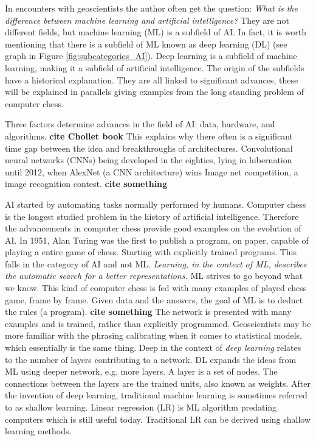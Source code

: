 \documentclass{article}
\begin{document}
In encounters with geoscientists the author often get the question: \textit{What is the difference between machine learning and artificial intelligence?} They are not different fields, but machine learning (ML) is a subfield of AI. In fact, it is worth mentioning that there is a subfield of ML known as deep learning (DL) (see graph in Figure \ref{fig:subcategories_AI}). Deep learning is a subfield of machine learning, making it a subfield of artificial intelligence. %
The origin of the subfields have a historical explanation. They are all linked to significant advances, these will be explained in parallels giving examples from the long standing problem of computer chess. 

Three factors determine advances in the field of AI: data, hardware, and algorithms. \textbf{cite Chollet book} This explains why there often is a significant time gap between the idea and breakthroughs of architectures. Convolutional neural networks (CNNs) being developed in the eighties, lying in hibernation until 2012, when AlexNet (a CNN architecture) wins Image net competition, a image recognition contest. \textbf{cite something} %

AI started by automating tasks normally performed by humans. Computer chess is the longest studied problem in the history of artificial intelligence. Therefore the advancements in computer chess provide good examples on the evolution of AI. In 1951, Alan Turing was the first to publish a program, on paper, capable of playing a entire game of chess. Starting with explicitly trained programs. This falls in the category of AI and not ML. \textit{Learning, in the context of ML, describes the automatic search for a better representations.} ML strives to go beyond what we know. This kind of computer chess is fed with many examples of played chess game, frame by frame. Given data and the answers, the goal of ML is to deduct the rules (a program). \textbf{cite something}
The network is presented with many examples and is trained, rather than explicitly programmed. Geoscientists may be more familiar with the phrasing calibrating when it comes to statistical models, which essentially is the same thing. Deep in the context of \textit{deep learning} relates to the number of layers contributing to a network. DL expands the ideas from ML using deeper network, e.g. more layers. A layer is a set of nodes. The connections between the layers are the trained units, also known as weights. After the invention of deep learning, traditional machine learning is sometimes referred to as shallow learning. Linear regression (LR) is ML algorithm predating computers which is still useful today. Traditional LR can be derived using shallow learning methods.
\end{document}
